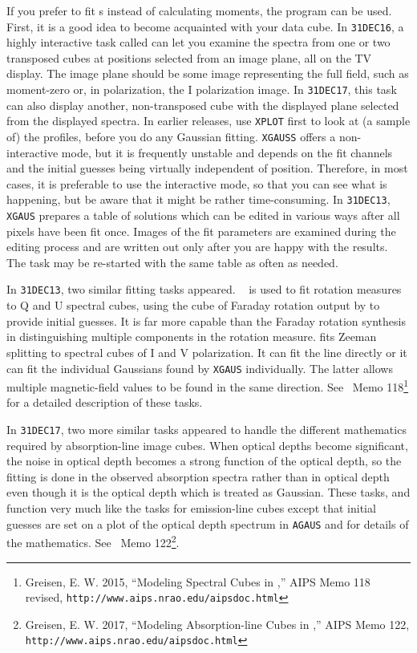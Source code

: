     If you prefer to fit s instead of calculating
moments, the program {\tt {}} can be used. First, it is a
good idea to become acquainted with your data cube.  In {\tt 31DEC16},
a highly interactive task called {\tt {}} can let you
examine the spectra from one or two transposed cubes at positions
selected from an image plane, all on the TV display.  The image plane
should be some image representing the full field, such as moment-zero
or, in polarization, the I polarization image.  In {\tt 31DEC17}, this
task can also display another, non-transposed cube with the displayed
plane selected from the displayed spectra.  In earlier releases, use
{\tt XPLOT} first to look at (a sample of) the profiles, before you do
any Gaussian fitting.  {\tt XGAUSS} offers a non-interactive mode, but
it is frequently unstable and depends on the fit channels and the
initial guesses being virtually independent of position.  Therefore,
in most cases, it is preferable to use the interactive mode, so that
you can see what is happening, but be aware that it might be rather
time-consuming.  In {\tt 31DEC13}, {\tt XGAUS} prepares
a table of solutions which can be edited in various ways after all
pixels have been fit once.  Images of the fit parameters are examined
during the editing process and are written out only after you are
happy with the results.  The task may be re-started with the same
table as often as needed.

     In {\tt 31DEC13}, two similar fitting tasks appeared.  {\tt
{}} is used to fit rotation measures to Q and U spectral
cubes, using the cube of Faraday rotation output by {\tt {}}
to provide initial guesses.  It is far more capable than the Faraday
rotation synthesis in distinguishing multiple components in the
rotation measure.  {\tt {}} fits Zeeman splitting to
spectral cubes of I and V polarization.  It can fit the line directly
or it can fit the individual Gaussians found by {\tt XGAUS}
individually.  The latter allows multiple magnetic-field values to be
found in the same direction.  See \AIPS\ Memo 118\footnote{Greisen, E.
W. 2015, ``Modeling Spectral Cubes in \AIPS,'' AIPS Memo 118 revised,
{\tt http://www.aips.nrao.edu/aipsdoc.html}} for a detailed
description of these tasks.

     In {\tt 31DEC17}, two more similar tasks appeared to handle the
different mathematics required by absorption-line image cubes.  When
optical depths become significant, the noise in optical depth becomes
a strong function of the optical depth, so the fitting is done in the
observed absorption spectra rather than in optical depth even though
it is the optical depth which is treated as Gaussian.  These tasks,
{\tt {}} and {\tt {}} function very much like the
tasks for emission-line cubes except that initial guesses are set on a
plot of the optical depth spectrum in {\tt AGAUS} and for details of
the mathematics.  See \AIPS\ Memo 122\footnote{Greisen, E. W. 2017,
``Modeling Absorption-line Cubes in \AIPS,'' AIPS Memo 122, {\tt
http://www.aips.nrao.edu/aipsdoc.html}}.

